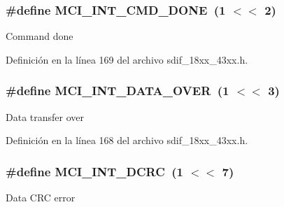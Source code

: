 \subsubsection[{\texorpdfstring{M\+C\+I\+\_\+\+I\+N\+T\+\_\+\+C\+M\+D\+\_\+\+D\+O\+NE}{MCI_INT_CMD_DONE}}]{\setlength{\rightskip}{0pt plus 5cm}\#define M\+C\+I\+\_\+\+I\+N\+T\+\_\+\+C\+M\+D\+\_\+\+D\+O\+NE~(1 $<$$<$ 2)}\hypertarget{group___s_d_i_f__18_x_x__43_x_x_ga38617824619b7483d6cbe562a55815b7}{}\label{group___s_d_i_f__18_x_x__43_x_x_ga38617824619b7483d6cbe562a55815b7}
Command done 

Definición en la línea 169 del archivo sdif\+\_\+18xx\+\_\+43xx.\+h.

\subsubsection[{\texorpdfstring{M\+C\+I\+\_\+\+I\+N\+T\+\_\+\+D\+A\+T\+A\+\_\+\+O\+V\+ER}{MCI_INT_DATA_OVER}}]{\setlength{\rightskip}{0pt plus 5cm}\#define M\+C\+I\+\_\+\+I\+N\+T\+\_\+\+D\+A\+T\+A\+\_\+\+O\+V\+ER~(1 $<$$<$ 3)}\hypertarget{group___s_d_i_f__18_x_x__43_x_x_gadcd78f4d1d60f699981d9bbb56ca8105}{}\label{group___s_d_i_f__18_x_x__43_x_x_gadcd78f4d1d60f699981d9bbb56ca8105}
Data transfer over 

Definición en la línea 168 del archivo sdif\+\_\+18xx\+\_\+43xx.\+h.

\subsubsection[{\texorpdfstring{M\+C\+I\+\_\+\+I\+N\+T\+\_\+\+D\+C\+RC}{MCI_INT_DCRC}}]{\setlength{\rightskip}{0pt plus 5cm}\#define M\+C\+I\+\_\+\+I\+N\+T\+\_\+\+D\+C\+RC~(1 $<$$<$ 7)}\hypertarget{group___s_d_i_f__18_x_x__43_x_x_ga7b29c9ec8226501bc5c9363400edcdc4}{}\label{group___s_d_i_f__18_x_x__43_x_x_ga7b29c9ec8226501bc5c9363400edcdc4}
Data C\+RC error 

